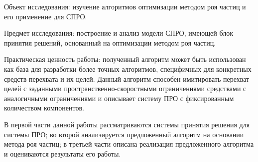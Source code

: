 Объект исследования: изучение алгоритмов оптимизации методом роя частиц и его применение для СПРО.

Предмет исследования: построение и анализ модели СПРО, имеющей блок принятия решений, основанный на оптимизации методом роя частиц.

Практическая ценность работы: полученный алгоритм может быть использован как база для разработки более точных алгоритмов, специфичных для конкретных средств перехвата и их целей. Данный алгоритм способен имитировать перехват целей с заданными пространственно-скоростными ограничениями средствами с аналогичными ограничениями и описывает систему ПРО с фиксированным количеством компонентов. 


В первой части данной работы рассматриваются  системы принятия решения для системы ПРО; во второй анализируется предложенный алгоритм на основании метода роя частиц; в третьей части описана реализация предложенного алгоритма и оцениваются результаты его работы. 


 \newpage %
